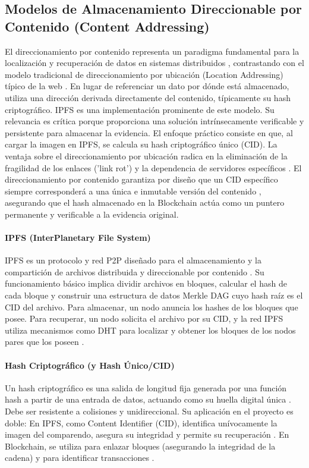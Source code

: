 \subsection{Modelos de Almacenamiento Direccionable por Contenido (Content Addressing)} 
El direccionamiento por contenido representa un paradigma fundamental para la localización y recuperación de datos en sistemas distribuidos \parencite{voigt2017gdpr}, contrastando con el modelo tradicional de direccionamiento por ubicación (Location Addressing) típico de la web \parencite{fielding2000architectural}. En lugar de referenciar un dato por dónde está almacenado, utiliza una dirección derivada directamente del contenido, típicamente su hash criptográfico. IPFS \parencite{benet2014ipfs} es una implementación prominente de este modelo. Su relevancia es crítica porque proporciona una solución intrínsecamente verificable y persistente para almacenar la evidencia. El enfoque práctico consiste en que, al cargar la imagen en IPFS, se calcula su hash criptográfico único (CID). La ventaja sobre el direccionamiento por ubicación radica en la eliminación de la fragilidad de los enlaces ('link rot') y la dependencia de servidores específicos \parencite{voigt2017gdpr}. El direccionamiento por contenido garantiza por diseño que un CID específico siempre corresponderá a una única e inmutable versión del contenido \parencite{benet2014ipfs}, asegurando que el hash almacenado en la Blockchain actúa como un puntero permanente y verificable a la evidencia original. 

\paragraph{IPFS (InterPlanetary File System)} 
IPFS es un protocolo y red P2P diseñado para el almacenamiento y la compartición de archivos distribuida y direccionable por contenido \parencite{benet2014ipfs}. Su funcionamiento básico implica dividir archivos en bloques, calcular el hash de cada bloque y construir una estructura de datos Merkle DAG cuyo hash raíz es el CID del archivo. Para almacenar, un nodo anuncia los hashes de los bloques que posee. Para recuperar, un nodo solicita el archivo por su CID, y la red IPFS utiliza mecanismos como DHT \parencite{maymounkov2002kademlia} para localizar y obtener los bloques de los nodos pares que los poseen \parencite{benet2014ipfs}. 

\paragraph{Hash Criptográfico (y Hash Único/CID)} 
Un hash criptográfico es una salida de longitud fija generada por una función hash a partir de una entrada de datos, actuando como su huella digital única \parencite{menezes1996handbook}. Debe ser resistente a colisiones y unidireccional. Su aplicación en el proyecto es doble: En IPFS, como Content Identifier (CID), identifica unívocamente la imagen del comparendo, asegura su integridad y permite su recuperación \parencite{benet2014ipfs}. En Blockchain, se utiliza para enlazar bloques (asegurando la integridad de la cadena) y para identificar transacciones \parencite{nakamoto2008bitcoin}. 


